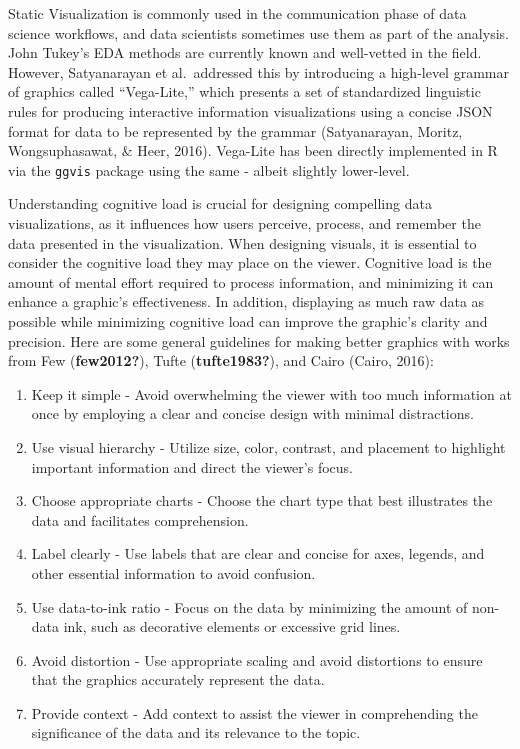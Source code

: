 \documentclass[print]{nuthesis}
\begin{document}
Static Visualization is commonly used in the communication phase of data science workflows, and data scientists sometimes use them as part of the analysis.
John Tukey's EDA methods are currently known and well-vetted in the field.
However, Satyanarayan et al.~addressed this by introducing a high-level grammar of graphics called ``Vega-Lite,'' which presents a set of standardized linguistic rules for producing interactive information visualizations using a concise JSON format for data to be represented by the grammar (Satyanarayan, Moritz, Wongsuphasawat, \& Heer, 2016).
Vega-Lite has been directly implemented in R via the \texttt{ggvis} package using the same - albeit slightly lower-level.

Understanding cognitive load is crucial for designing compelling data visualizations, as it influences how users perceive, process, and remember the data presented in the visualization.
When designing visuals, it is essential to consider the cognitive load they may place on the viewer.
Cognitive load is the amount of mental effort required to process information, and minimizing it can enhance a graphic's effectiveness.
In addition, displaying as much raw data as possible while minimizing cognitive load can improve the graphic's clarity and precision.
Here are some general guidelines for making better graphics with works from Few (\textbf{few2012?}), Tufte (\textbf{tufte1983?}), and Cairo (Cairo, 2016):

\begin{enumerate}
\def\labelenumi{\arabic{enumi}.}
\item
  Keep it simple - Avoid overwhelming the viewer with too much information at once by employing a clear and concise design with minimal distractions.
\item
  Use visual hierarchy - Utilize size, color, contrast, and placement to highlight important information and direct the viewer's focus.
\item
  Choose appropriate charts - Choose the chart type that best illustrates the data and facilitates comprehension.
\item
  Label clearly - Use labels that are clear and concise for axes, legends, and other essential information to avoid confusion.
\item
  Use data-to-ink ratio - Focus on the data by minimizing the amount of non-data ink, such as decorative elements or excessive grid lines.
\item
  Avoid distortion - Use appropriate scaling and avoid distortions to ensure that the graphics accurately represent the data.
\item
  Provide context - Add context to assist the viewer in comprehending the significance of the data and its relevance to the topic.
\end{enumerate}
\end{document}
